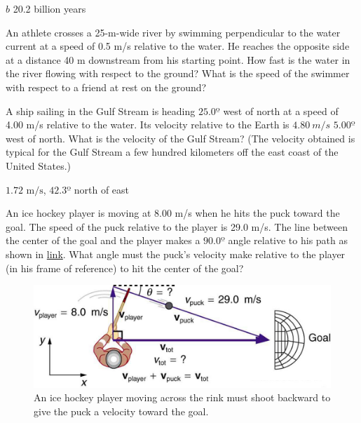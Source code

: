 \documentclass[
]{book}
\begin{document}
\(b\) 20.2 billion years

\hypertarget{fs-id2080170}{}
\leavevmode{}%
An athlete crosses a 25-m-wide river by swimming perpendicular to the
water current at a speed of 0.5 m/s relative to the water. He reaches
the opposite side at a distance 40 m downstream from his starting point.
How fast is the water in the river flowing with respect to the ground?
What is the speed of the swimmer with respect to a friend at rest on the
ground?

\hypertarget{fs-id2040310}{}
\leavevmode{}%
A ship sailing in the Gulf Stream is heading \(25.0º{}\) west of north at
a speed of 4.00 m/s relative to the water. Its velocity relative to the
Earth is \(4.80\ m/s{}\) \(5.00º{}\) west of north. What is the velocity of
the Gulf Stream? (The velocity obtained is typical for the Gulf Stream a
few hundred kilometers off the east coast of the United States.)

\leavevmode{}%
\({1\text{.}\text{72\ m/s}}{}\), \(42.3º{}\) north of east

\hypertarget{fs-id1769191}{}
\leavevmode{}%
An ice hockey player is moving at 8.00 m/s when he hits the puck toward
the goal. The speed of the puck relative to the player is 29.0 m/s. The
line between the center of the goal and the player makes a \(90.0º{}\)
angle relative to his path as shown in
\protect\hyperlink{import-auto-id1829266}{link}. What angle must
the puck's velocity make relative to the player (in his frame of
reference) to hit the center of the goal?

\begin{figure}
\hypertarget{import-auto-id1829266}{%
\centering
\includegraphics{images/Figure_03_05_08a.jpg}
\caption{An ice hockey player moving across the rink must shoot backward to
give the puck a velocity toward the
goal.}\label{import-auto-id1829266}
}
\end{figure}
\end{document}
